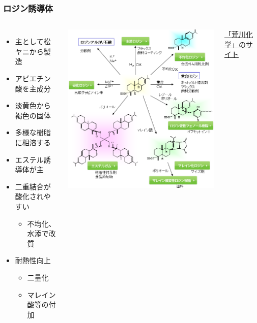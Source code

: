 \documentclass[unicode,12pt]{beamer}%
\begin{document}
\begin{frame}
	\frametitle{ロジン誘導体}
		\begin{columns}[c, onlytextwidth]
				\begin{itemize}
					\item 主として松ヤニから製造
					\item アビエチン酸を主成分
					\item 淡黄色から褐色の固体
					\item 多様な樹脂に相溶する
					\item エステル誘導体が主
					\item 二重結合が酸化されやすい
					\begin{itemize}
						\item 不均化、水添で改質
					\end{itemize}
					\item 耐熱性向上
					\begin{itemize}
						\item 二量化
						\item マレイン酸等の付加
					\end{itemize}
				\end{itemize}
				\centering
				\includegraphics[width=\textwidth]{tackifier_rosin.png}

				\href{https://www.arakawachem.co.jp/jp/technology/catalog/02.html}{「荒川化学」のサイト}
		\end{columns}

\end{frame}
\end{document}
